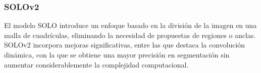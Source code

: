 \subsubsection{SOLOv2}
El modelo SOLO \cite{SOLOv1} introduce un enfoque basado en la división de la imagen en una malla de cuadrículas, eliminando la necesidad de propuestas de regiones o anclas. SOLOv2 \cite{SOLOv2} incorpora mejoras significativas, entre las que destaca la convolución dinámica, con la que se obtiene una mayor precisión en segmentación sin aumentar considerablemente la complejidad computacional.

